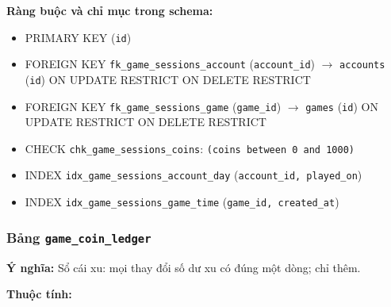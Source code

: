 \textbf{Ràng buộc và chỉ mục trong schema:}

\begin{itemize}

\item PRIMARY KEY (\texttt{id})

\item FOREIGN KEY \texttt{fk\_game\_sessions\_account} (\texttt{account\_id}) $\rightarrow$ \texttt{accounts} (\texttt{id}) ON UPDATE RESTRICT ON DELETE RESTRICT

\item FOREIGN KEY \texttt{fk\_game\_sessions\_game} (\texttt{game\_id}) $\rightarrow$ \texttt{games} (\texttt{id}) ON UPDATE RESTRICT ON DELETE RESTRICT

\item CHECK \texttt{chk\_game\_sessions\_coins}: \texttt{(coins between 0 and 1000)}

\item INDEX \texttt{idx\_game\_sessions\_account\_day} (\texttt{account\_id, played\_on})

\item INDEX \texttt{idx\_game\_sessions\_game\_time} (\texttt{game\_id, created\_at})

\end{itemize}

\subsubsection{Bảng \texttt{game\_coin\_ledger}}

\textbf{Ý nghĩa:} Sổ cái xu: mọi thay đổi số dư xu có đúng một dòng; chỉ thêm.\par

\textbf{Thuộc tính:}

